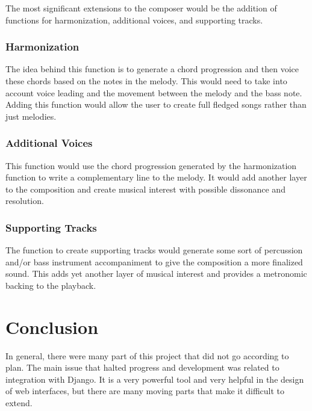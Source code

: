 The most significant extensions to the composer would be the addition of functions for harmonization, additional voices, and supporting tracks.

\subsubsection{Harmonization}
\label{subsubsec:harmonization}

The idea behind this function is to generate a chord progression and then voice these chords based on the notes in the melody.  This would need to take into account voice leading and the movement between the melody and the bass note.  Adding this function would allow the user to create full fledged songs rather than just melodies.

\subsubsection{Additional Voices}
\label{subsubsec:additionalvoices}

This function would use the chord progression generated by the harmonization function to write a complementary line to the melody.  It would add another layer to the composition and create musical interest with possible dissonance and resolution.

\subsubsection{Supporting Tracks}
\label{subsubsec:supportingtracks}

The function to create supporting tracks would generate some sort of percussion and/or bass instrument accompaniment to give the composition a more finalized sound.  This adds yet another layer of musical interest and provides a metronomic backing to the playback.

\section{Conclusion}
\label{conclusion}

In general, there were many part of this project that did not go according to plan.  The main issue that halted progress and development was related to integration with Django.  It is a very powerful tool and very helpful in the design of web interfaces, but there are many moving parts that make it difficult to extend.

\vspace{\baselineskip}

